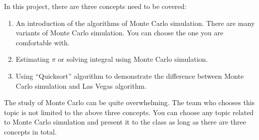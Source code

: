 \documentclass{article}
\theoremstyle{definition}
\theoremstyle{remark}
\begin{document}
In this project, there are three concepts need to be covered:
\begin{enumerate}
    \item An introduction of the algorithms of Monte Carlo simulation. There are many variants of Monte Carlo simulation. You can choose the one you are comfortable with.
    \item Estimating $\pi$ or solving integral using Monte Carlo simulation.
    \item Using ``Quicksort'' algorithm to demonstrate the difference between Monte Carlo simulation and Las Vegas algorithm.
\end{enumerate}

The study of Monte Carlo can be quite overwhelming. The team who chooses this topic is not limited to the above three concepts. You can choose any topic related to Monte Carlo simulation and present it to the class as long as there are three concepts in total.
\end{document}
